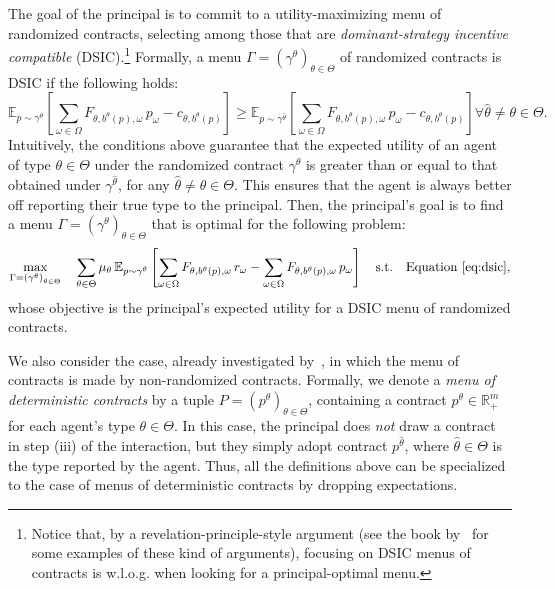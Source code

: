 The goal of the principal is to commit to a utility-maximizing menu of randomized contracts, selecting among those that are \emph{dominant-strategy incentive compatible} (DSIC).\footnote{Notice that, by a revelation-principle-style argument (see the book by~\citet{shoham2008multiagent} for some examples of these kind of arguments), focusing on DSIC menus of contracts is w.l.o.g. when looking for a principal-optimal menu.}
%
Formally, a menu $\Gamma = \left( \gamma^\theta \right)_{\theta \in \Theta}$ of randomized contracts is DSIC if the following holds:
\begin{equation}\label{eq:dsic}
	\mathbb{E}_{p \sim \gamma^\theta} \left[  \sum_{\omega \in \Omega} F_{\theta, b^\theta(p), \omega} \, p_\omega - c_{\theta, b^\theta(p)} \right]  \geq \mathbb{E}_{p \sim \gamma^{\hat \theta}} \left[  \sum_{\omega \in \Omega} F_{\theta, b^\theta(p),\omega} \, p_\omega - c_{\theta, b^\theta(p)}  \right]    \forall \hat \theta \neq \theta \in \Theta.
\end{equation}
%
Intuitively, the conditions above guarantee that the expected utility of an agent of type $\theta \in \Theta$ under the randomized contract $\gamma^\theta$ is greater than or equal to that obtained under $\gamma^{\hat \theta}$, for any $\hat \theta \neq \theta \in \Theta$.
%
This ensures that the agent is always better off reporting their true type to the principal.
%
Then, the principal's goal is to find a menu $\Gamma = \left( \gamma^\theta \right)_{\theta \in \Theta}$ that is optimal for the following problem:
\begin{equation}\label{eq:problem}
	\max_{\Gamma = \left( \gamma^\theta \right)_{\theta \in \Theta}} \quad \sum_{\theta \in \Theta} \mu_\theta \, \mathbb{E}_{p \sim \gamma^\theta} \left[  \sum_{\omega \in \Omega} F_{\theta, b^\theta(p), \omega} \, r_\omega -\sum_{\omega \in \Omega} F_{\theta, b^\theta(p), \omega} \, p_\omega \right] \quad \textnormal{s.t.} \quad \textnormal{Equation~\eqref{eq:dsic}},
\end{equation}
%
whose objective is the principal's expected utility for a DSIC menu of randomized contracts.


We also consider the case, already investigated by~\citet{guruganesh2021contracts}, in which the menu of contracts is made by non-randomized contracts.
%
Formally, we denote a \emph{menu of deterministic contracts} by a tuple $P = \left(  p^\theta \right)_{\theta \in \Theta}$, containing a contract $p^\theta \in \mathbb{R}^m_+$ for each agent's type $\theta \in \Theta$.
%
In this case, the principal does \emph{not} draw a contract in step (iii) of the interaction, but they simply adopt contract $p^{\hat \theta}$, where $\hat \theta \in \Theta$ is the type reported by the agent.
%
Thus, all the definitions above can be specialized to the case of menus of deterministic contracts by dropping expectations. 